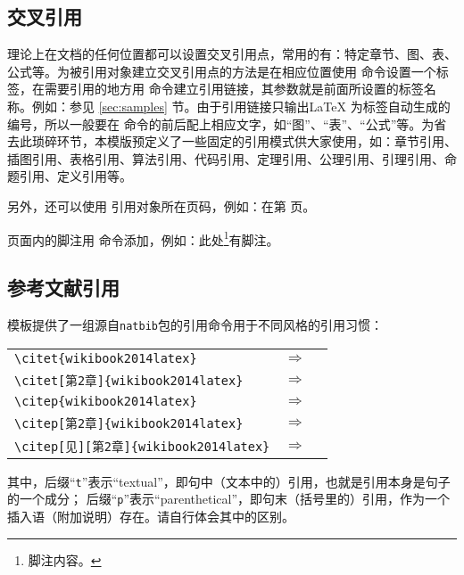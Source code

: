\subsection{交叉引用}
理论上在文档的任何位置都可以设置交叉引用点，常用的有：特定章节、图、表、公式等。为被引用对象建立交叉引用点的方法是在相应位置使用 命令设置一个标签，在需要引用的地方用  命令建立引用链接，其参数就是前面所设置的标签名称。例如：参见 \ref{sec:samples} 节。由于引用链接只输出\LaTeX{} 为标签自动生成的编号，所以一般要在  命令的前后配上相应文字，如“图”、“表”、“公式”等。为省去此琐碎环节，本模版预定义了一些固定的引用模式供大家使用，如：章节引用、插图引用、表格引用、算法引用、代码引用、定理引用、公理引用、引理引用、命题引用、定义引用等。

另外，还可以使用 引用对象所在页码，例如：在第 \pageref{fig:samples:blcfy} 页。

页面内的脚注用 命令添加，例如：此处\footnote{脚注内容。}有脚注。

\subsection{参考文献引用}\label{sec:samples:cite}
模板提供了一组源自\texttt{natbib}包的引用命令用于不同风格的引用习惯：
\begin{center}
\begin{tabular}{lcl}
\verb|\citet{wikibook2014latex}| & $\Rightarrow$ & \citet{wikibook2014latex} \\
\verb|\citet[第2章]{wikibook2014latex}| & $\Rightarrow$ & \citet[第2章]{wikibook2014latex} \\
\verb|\citep{wikibook2014latex}| & $\Rightarrow$ & \citep{wikibook2014latex} \\
\verb|\citep[第2章]{wikibook2014latex}| & $\Rightarrow$ & \citep[第2章]{wikibook2014latex} \\
\verb|\citep[见][第2章]{wikibook2014latex}| & $\Rightarrow$ & \citep[见][第2章]{wikibook2014latex}
\end{tabular}
\end{center}

其中，后缀“\texttt{t}”表示“textual”，即句中（文本中的）引用，也就是引用本身是句子的一个成分；
后缀“\texttt{p}”表示“parenthetical”，即句末（括号里的）引用，作为一个插入语（附加说明）存在。请自行体会其中的区别。


